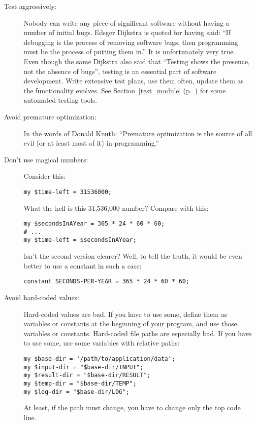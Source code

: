 \begin{description}
\item[Test aggressively:] Nobody can write any piece of 
significant software without having a number of initial 
bugs. Edsger Dijkstra is quoted for having said: ``If 
debugging is the process of removing software bugs,
then programming must be the process of putting them in.'' 
It is unfortunately very true. Even though the same Dijkstra 
also said that ``Testing shows the presence, not the absence 
of bugs'', testing is an essential part of software 
development. Write extensive test plans, use them often,
update them as the functionality evolves. See Section~\ref{test_module} 
(p.~\pageref{test_module}) for some automated testing tools.

\item[Avoid premature optimization:] In the words of Donald 
Knuth: ``Premature optimization is the source of all evil (or 
at least most of it) in programming.''

\item[Don't use magical numbers:] Consider this:
\begin{verbatim}
my $time-left = 31536000;
\end{verbatim}

What the hell is this 31,536,000 number? Compare with this:

\begin{verbatim}
my $secondsInAYear = 365 * 24 * 60 * 60;
# ...
my $time-left = $secondsInAYear;
\end{verbatim}

Isn't the second version clearer? Well, to tell the 
truth, it would be even better to use a constant in 
such a case:
\begin{verbatim}
constant SECONDS-PER-YEAR = 365 * 24 * 60 * 60;
\end{verbatim}

\item[Avoid hard-coded values:] Hard-coded values are bad.
If you have to use some, define them as variables or constants 
at the beginning of your program, and use those variables or 
constants. Hard-coded file paths are especially bad. If you 
have to use some, use some variables with relative paths:
\begin{verbatim}
my $base-dir = '/path/to/application/data';
my $input-dir = "$base-dir/INPUT";
my $result-dir = "$base-dir/RESULT";
my $temp-dir = "$base-dir/TEMP";
my $log-dir = "$base-dir/LOG";
\end{verbatim}
At least, if the path must change, you have to change only 
the top code line.


\end{description}

